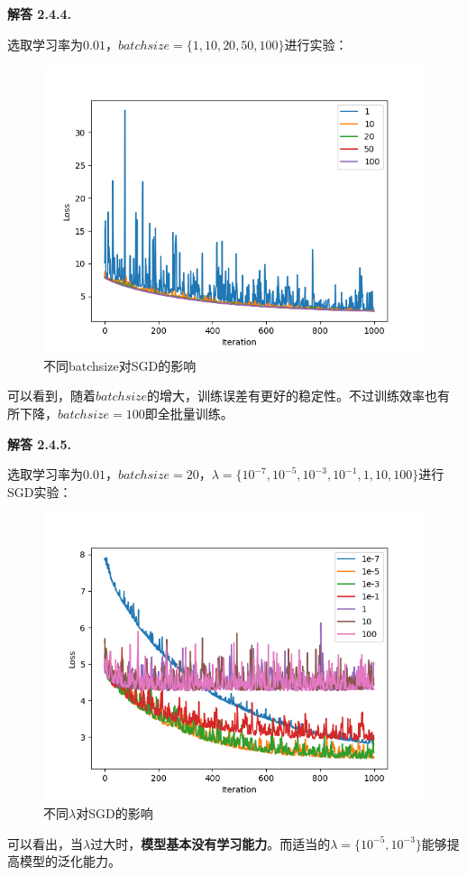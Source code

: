 \documentclass[12pt, a4paper, oneside]{ctexart}
\newenvironment{solution}[1]{\par\noindent\textbf{解答 #1. }\par}{\par}
\begin{document}
\begin{solution}{2.4.4}
    选取学习率为$0.01$，$batchsize = \{1, 10, 20, 50, 100\}$进行实验：
    \begin{figure}[htbp]
        \centering
        \includegraphics[width=.7\textwidth]{pic/Figure_5.png}
        \caption{不同batchsize对SGD的影响}
    \end{figure}
    可以看到，随着$batchsize$的增大，训练误差有更好的稳定性。不过训练效率也有所下降，$batchsize = 100$即全批量训练。
\end{solution}

\begin{solution}{2.4.5}
    选取学习率为$0.01$，$batchsize = 20$，$\lambda = \{ 10^{-7}, 10^{-5}, 10^{-3}, 10^{-1}, 1, 10, 100\}$进行SGD实验：
    \begin{figure}[htbp]
        \centering
        \includegraphics[width=.7\textwidth]{pic/Figure_6.png}
        \caption{不同$\lambda$对SGD的影响}
    \end{figure}
    可以看出，当$\lambda$过大时，\textbf{模型基本没有学习能力}。而适当的$\lambda = \{10^{-5}, 10^{-3}\}$能够提高模型的泛化能力。
\end{solution}
\end{document}
